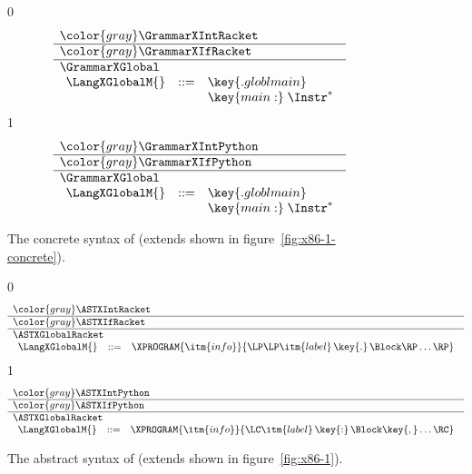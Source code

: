 \documentclass[7x10]{TimesAPriori_MIT}%
\newcommand{\gray}[1]{{\color{gray} #1}}
\def\racketEd{0}
\def\pythonEd{1}
\def\edition{1}
\newcommand{\pythonColor}[0]{}
\numberwithin{theorem}{chapter}
\numberwithin{definition}{chapter}
\numberwithin{equation}{chapter}
\begin{document}
\begin{figure}[tp]
  \begin{tcolorbox}[colback=white]
{\if\edition\racketEd
\[
\begin{array}{l}
  \gray{\GrammarXIntRacket} \\ \hline
  \gray{\GrammarXIfRacket} \\ \hline
  \GrammarXGlobal \\
\begin{array}{lcl}
\LangXGlobalM{} &::= &  \key{.globl main} \\
      &    &  \key{main:} \; \Instr^{*} 
\end{array}
\end{array}
\]
\fi}
{\if\edition\pythonEd\pythonColor    
\[
\begin{array}{l}
  \gray{\GrammarXIntPython} \\ \hline
  \gray{\GrammarXIfPython} \\ \hline
  \GrammarXGlobal \\
\begin{array}{lcl}
\LangXGlobalM{} &::= &  \key{.globl main} \\
      &    &  \key{main:} \; \Instr^{*} 
\end{array}
\end{array}
\]
\fi}
  \end{tcolorbox}
\caption{The concrete syntax of \LangXGlobal{}  (extends \LangXIf{} shown in figure~\ref{fig:x86-1-concrete}).}
\label{fig:x86-2-concrete}
\end{figure}

\begin{figure}[tp]
\begin{tcolorbox}[colback=white]
    \small
{\if\edition\racketEd    
\[
\begin{array}{l}
  \gray{\ASTXIntRacket} \\ \hline
  \gray{\ASTXIfRacket} \\ \hline
  \ASTXGlobalRacket \\
\begin{array}{lcl}
\LangXGlobalM{} &::= & \XPROGRAM{\itm{info}}{\LP\LP\itm{label} \,\key{.}\, \Block \RP\ldots\RP}
\end{array}
\end{array}
\]
\fi}
{\if\edition\pythonEd\pythonColor
\[
\begin{array}{l}
  \gray{\ASTXIntPython} \\ \hline
  \gray{\ASTXIfPython} \\ \hline
  \ASTXGlobalRacket \\
\begin{array}{lcl}
\LangXGlobalM{} &::= & \XPROGRAM{\itm{info}}{\LC\itm{label} \,\key{:}\, \Block \key{,} \ldots \RC }
\end{array}
\end{array}
\]
\fi}
\end{tcolorbox}

\caption{The abstract syntax of \LangXGlobal{} (extends \LangXIf{} shown in figure~\ref{fig:x86-1}).}
\label{fig:x86-2}
\end{figure}
\end{document}
